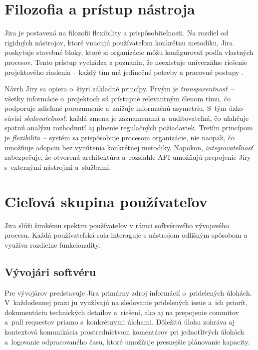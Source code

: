 \section{Filozofia a prístup nástroja}

Jira je postavená na filozofii flexibility a prispôsobiteľnosti. Na rozdiel od rigidných nástrojov, ktoré vnucujú používateľom konkrétnu metodiku, Jira poskytuje stavebné bloky, ktoré si organizácie môžu konfigurovať podľa vlastných procesov. Tento prístup vychádza z poznania, že neexistuje univerzálne riešenie projektového riadenia -- každý tím má jedinečné potreby a pracovné postupy \cite{atlassian_agile2024}.

Návrh Jiry sa opiera o~štyri základné princípy. Prvým je \textit{transparentnosť}~-- všetky informácie o~projektoch sú prístupné relevantným členom tímu, čo podporuje zdieľané porozumenie a~znižuje informačnú asymetriu. S~tým úzko súvisí \textit{sledovateľnosť}: každá zmena je zaznamenaná a~auditovateľná, čo uľahčuje spätnú analýzu rozhodnutí aj plnenie regulačných požiadaviek. Tretím princípom je \textit{flexibilita}~-- systém sa prispôsobuje procesom organizácie, nie naopak, čo umožňuje adopciu bez vynútenia konkrétnej metodiky. Napokon, \textit{integrovateľnosť} zabezpečuje, že otvorená architektúra a~rozsiahle API umožňujú prepojenie Jiry s~externými nástrojmi a~službami.

\section{Cieľová skupina používateľov}

Jira slúži širokému spektru používateľov v rámci softvérového vývojového procesu. Každá používateľská rola interaguje s nástrojom odlišným spôsobom a využíva rozdielne funkcionality.

\subsection{Vývojári softvéru}

Pre vývojárov predstavuje Jira primárny zdroj informácií o~pridelených úlohách. V~každodennej praxi ju využívajú na sledovanie pridelených issue a~ich priorít, dokumentáciu technických detailov a~riešení, ako aj na prepojenie commitov a~pull requestov priamo s~konkrétnymi úlohami. Dôležitú úlohu zohráva aj kontextová komunikácia prostredníctvom komentárov pri jednotlivých úlohách a~logovanie odpracovaného času, ktoré umožňuje presnejšie plánovanie kapacity.


